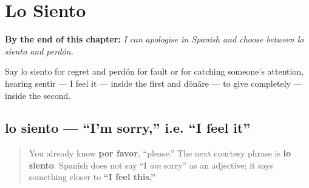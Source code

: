 
\chapter{Lo Siento}
\label{ch:spanish-sorry}

\begin{chapteropening}
\textbf{By the end of this chapter:} \emph{I can apologise in Spanish and choose between lo siento and perdón.}

Say lo siento for regret and perdón for fault or for catching someone's attention, hearing sentir — I feel it — inside the first and dōnāre — to give completely — inside the second.
\end{chapteropening}

\section[lo siento]{lo siento — \textquotedblleft{}I'm sorry,\textquotedblright{} i.e. \textquotedblleft{}I feel it\textquotedblright{}}

\label{lesson:ES-C20-lo-siento}



\begin{quote}
You already know \textbf{por favor}, \textquotedblleft{}please.\textquotedblright{} The next courtesy phrase is \textbf{lo siento}. Spanish does not say \textquotedblleft{}I \emph{am} sorry\textquotedblright{} as an adjective; it says something closer to \textbf{\textquotedblleft{}I feel this.\textquotedblright{}}
\end{quote}


